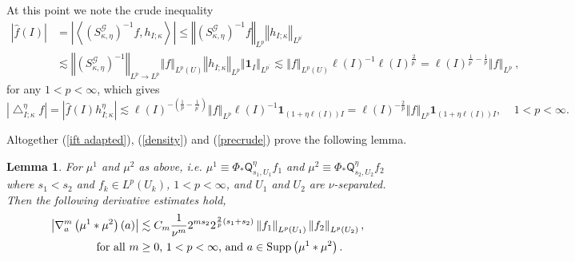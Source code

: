 \documentclass{amsart}%
\theoremstyle{plain}
\newtheorem{lemma}[theorem]{Lemma}
\numberwithin{equation}{section}
\begin{document}
At this point we note the crude inequality%
\begin{align*}
\left\vert \widehat{f}\left(  I\right)  \right\vert  &  =\left\vert
\left\langle \left(  S_{\kappa,\eta}^{\mathcal{G}}\right)  ^{-1}f,h_{I;\kappa
}\right\rangle \right\vert \leq\left\Vert \left(  S_{\kappa,\eta}%
^{\mathcal{G}}\right)  ^{-1}f\right\Vert _{L^{p}}\left\Vert h_{I;\kappa
}\right\Vert _{L^{p^{\prime}}}\\
&  \lesssim\left\Vert \left(  S_{\kappa,\eta}^{\mathcal{G}}\right)
^{-1}\right\Vert _{L^{p}\rightarrow L^{p}}\left\Vert f\right\Vert
_{L^{p}\left(  U\right)  }\left\Vert h_{I;\kappa}\right\Vert _{L^{p}%
}\left\Vert \mathbf{1}_{I}\right\Vert _{L^{p^{\prime}}}\lesssim\left\Vert
f\right\Vert _{L^{p}\left(  U\right)  }\ell\left(  I\right)  ^{-1}\ell\left(
I\right)  ^{\frac{2}{p^{\prime}}}=\ell\left(  I\right)  ^{\frac{1}{p^{\prime}%
}-\frac{1}{p}}\left\Vert f\right\Vert _{L^{p}}\ ,
\end{align*}
for any $1<p<\infty$, which gives%
\begin{equation}
\left\vert \bigtriangleup_{I;\kappa}^{\eta}f\right\vert =\left\vert
\widehat{f}\left(  I\right)  h_{I;\kappa}^{\eta}\right\vert \lesssim
\ell\left(  I\right)  ^{-\left(  \frac{1}{p}-\frac{1}{p^{\prime}}\right)
}\left\Vert f\right\Vert _{L^{p}}\ell\left(  I\right)  ^{-1}\mathbf{1}%
_{\left(  1+\eta\ell\left(  I\right)  \right)  I}=\ell\left(  I\right)
^{-\frac{2}{p}}\left\Vert f\right\Vert _{L^{p}}\mathbf{1}_{\left(  1+\eta
\ell\left(  I\right)  \right)  I},\ \ \ \ \ 1<p<\infty.\label{precrude}%
\end{equation}


Altogether (\ref{ift adapted}), (\ref{density}) and (\ref{precrude}) prove the
following lemma.

\begin{lemma}
\label{scales}For $\mu^{1}$ and $\mu^{2}$ as above, i.e. $\mu^{1}\equiv
\Phi_{\ast}\mathsf{Q}_{s_{1},U_{1}}^{\eta}f_{1}$ and $\mu^{2}\equiv\Phi_{\ast
}\mathsf{Q}_{s_{2},U_{2}}^{\eta}f_{2}$ where $s_{1}<s_{2}$ and $f_{k}\in
L^{p}\left(  U_{k}\right)  $, $1<p<\infty$, and $U_{1}$ and $U_{2}$ are $\nu
$-separated. Then the following derivative estimates hold,%
\begin{align*}
\left\vert \nabla_{a}^{m}\left(  \mu^{1}\ast\mu^{2}\right)  \left(  a\right)
\right\vert  &  \lesssim C_{m}\frac{1}{\nu^{m}}2^{ms_{2}}2^{\frac{2}{p}\left(
s_{1}+s_{2}\right)  }\left\Vert f_{1}\right\Vert _{L^{p}\left(  U_{1}\right)
}\left\Vert f_{2}\right\Vert _{L^{p}\left(  U_{2}\right)  },\\
\text{for all }m  &  \geq0\text{, }1<p<\infty\text{, and }a\in
\mathop{\rm Supp}\left(  \mu^{1}\ast\mu^{2}\right)  .
\end{align*}

\end{lemma}
\end{document}
